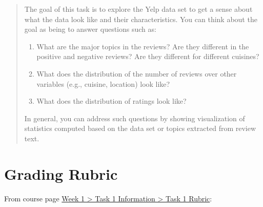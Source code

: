\documentclass[11pt]{article}
\providecommand{\tightlist}{%
      \setlength{\itemsep}{0pt}\setlength{\parskip}{0pt}}
\begin{document}
\begin{quote}
The goal of this task is to explore the Yelp data set to get a sense
about what the data look like and their characteristics. You can think
about the goal as being to answer questions such as:

\begin{enumerate}
\def\labelenumi{\arabic{enumi}.}
\tightlist
\item
  What are the major topics in the reviews? Are they different in the
  positive and negative reviews? Are they different for different
  cuisines?
\item
  What does the distribution of the number of reviews over other
  variables (e.g., cuisine, location) look like?
\item
  What does the distribution of ratings look like?
\end{enumerate}

In general, you can address such questions by showing visualization of
statistics computed based on the data set or topics extracted from
review text.
\end{quote}

    \hypertarget{grading-rubric}{%
\section{Grading Rubric}\label{grading-rubric}}

From course page
\href{https://www.coursera.org/learn/data-mining-project/supplement/Xk8lq/task-1-rubric}{Week
1 \textgreater{} Task 1 Information \textgreater{} Task 1 Rubric}:
\end{document}

